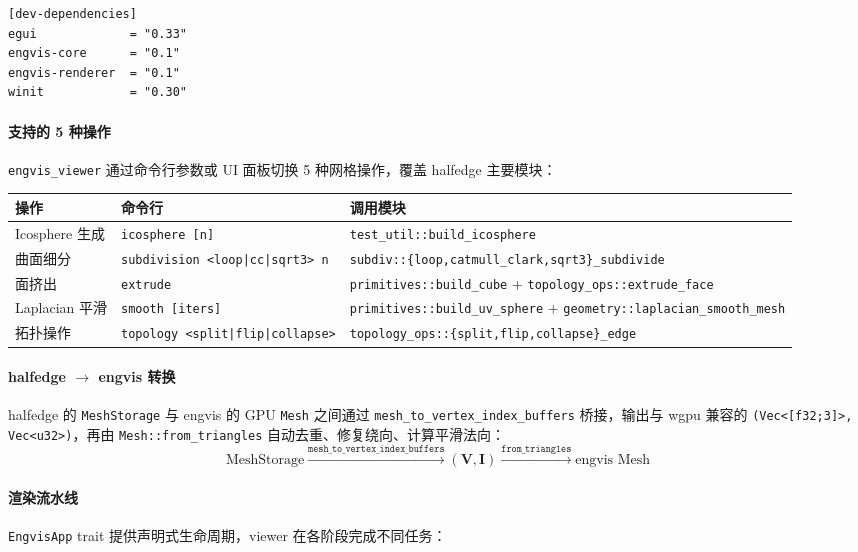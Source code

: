 \documentclass[11pt,a4paper]{article}
\begin{document}
\begin{lstlisting}
[dev-dependencies]
egui             = "0.33"
engvis-core      = "0.1"
engvis-renderer  = "0.1"
winit            = "0.30"
\end{lstlisting}

\paragraph{支持的 5 种操作}
\texttt{engvis\_viewer} 通过命令行参数或 UI 面板切换 5 种网格操作，覆盖 halfedge 主要模块：

\begin{center}
\renewcommand{\arraystretch}{1.18}
\begin{tabular}{@{}llp{6.5cm}@{}}
  \toprule
  \textbf{操作} & \textbf{命令行} & \textbf{调用模块} \\
  \midrule
  Icosphere 生成     & \texttt{icosphere [n]}                  & \texttt{test\_util::build\_icosphere} \\
  曲面细分           & \texttt{subdivision <loop|cc|sqrt3> n}  & \texttt{subdiv::\{loop,catmull\_clark,sqrt3\}\_subdivide} \\
  面挤出             & \texttt{extrude}                        & \texttt{primitives::build\_cube} + \texttt{topology\_ops::extrude\_face} \\
  Laplacian 平滑     & \texttt{smooth [iters]}                 & \texttt{primitives::build\_uv\_sphere} + \texttt{geometry::laplacian\_smooth\_mesh} \\
  拓扑操作           & \texttt{topology <split|flip|collapse>} & \texttt{topology\_ops::\{split,flip,collapse\}\_edge} \\
  \bottomrule
\end{tabular}
\end{center}

\paragraph{halfedge $\to$ engvis 转换}
halfedge 的 \texttt{MeshStorage} 与 engvis 的 GPU \texttt{Mesh} 之间通过
\texttt{mesh\_to\_vertex\_index\_buffers} 桥接，输出与 wgpu 兼容的
\texttt{(Vec<[f32;3]>, Vec<u32>)}，再由 \texttt{Mesh::from\_triangles}
自动去重、修复绕向、计算平滑法向：
\[
\text{MeshStorage} \xrightarrow{\texttt{mesh\_to\_vertex\_index\_buffers}} (\mathbf{V}, \mathbf{I}) \xrightarrow{\texttt{from\_triangles}} \text{engvis Mesh}
\]

\paragraph{渲染流水线}
\texttt{EngvisApp} trait 提供声明式生命周期，viewer 在各阶段完成不同任务：
\end{document}
